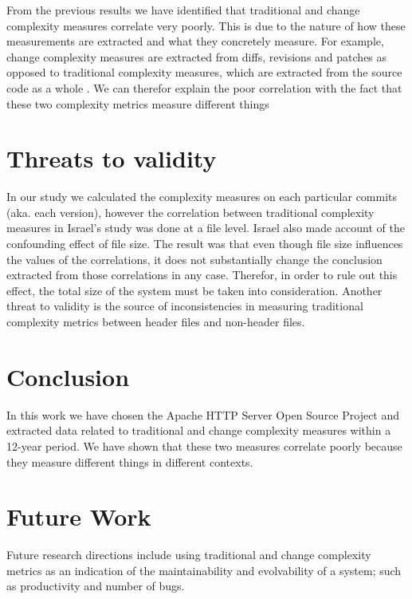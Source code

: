 \documentclass[9pt,twocolumn,a4paper]{article}
\begin{document}
From the previous results we have identified that traditional and change complexity measures correlate very poorly. This is due to the nature of how these measurements are extracted and what they concretely measure. For example, change complexity measures are extracted from diffs, revisions and patches as opposed to traditional complexity measures, which are extracted from the source code as a whole \cite{Hindle}. We can therefor explain the poor correlation with the fact that these two complexity metrics measure different things


\section{Threats to validity}
In our study we calculated the complexity measures on each particular commits (aka. each version), however the correlation between traditional complexity measures in Israel's study \cite{Israel} was done at a file level. Israel also made account of the confounding effect of file size. The result was that even though file size influences the values of the correlations, it does not substantially change the conclusion extracted from those correlations in any case. Therefor, in order to rule out this effect, the total size of the system must be taken into consideration. Another threat to validity is the source of inconsistencies in measuring traditional complexity metrics between header files and non-header files.
\section{Conclusion}

In this work we have chosen the Apache HTTP Server Open Source Project and extracted data related to traditional and change complexity measures within a 12-year period. We have shown that these two measures correlate poorly because they measure different things in different contexts.

\section{Future Work}
Future research directions include using traditional and change complexity metrics as an indication of the maintainability and evolvability of a system; such as productivity and number of bugs.
\end{document}
